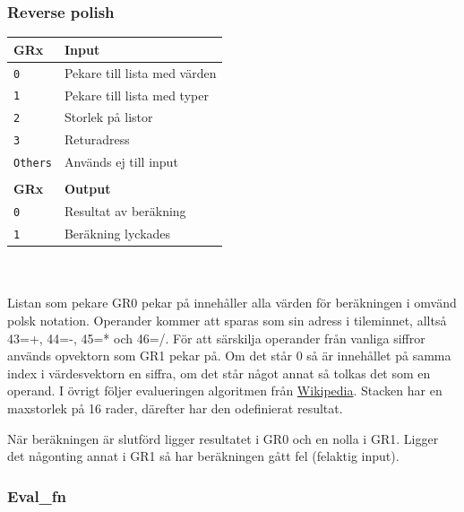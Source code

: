 \documentclass[]{article}
\begin{document}
\subsubsection{Reverse polish}
\begin{tabular}{ll}
	\textbf{GRx}    & \textbf{Input}               \\ \hline
	\texttt{0}      & Pekare till lista med värden \\
	\texttt{1}      & Pekare till lista med typer  \\
	\texttt{2}      & Storlek på listor            \\
	\texttt{3}      & Returadress                  \\
	\texttt{Others} & Används ej till input        \\
	                &  \\
	\textbf{GRx}    & \textbf{Output}              \\ \hline
	\texttt{0}      & Resultat av beräkning        \\
	\texttt{1}      & Beräkning lyckades
\end{tabular}
\\\\
\noindent
Listan som pekare GR0 pekar på innehåller alla värden för beräkningen i omvänd polsk notation. Operander kommer att sparas som sin adress i tileminnet, alltså 43=+, 44=-, 45=* och 46=/. För att särskilja operander från vanliga siffror används opvektorn som GR1 pekar på. Om det står 0 så är innehållet på samma index i värdesvektorn en siffra, om det står något annat så tolkas det som en operand. I övrigt följer evalueringen algoritmen från \href{https://en.wikipedia.org/wiki/Reverse_Polish_notation#Postfix_algorithm}{Wikipedia}. Stacken har en maxstorlek på 16 rader, därefter har den odefinierat resultat. 

När beräkningen är slutförd ligger resultatet i GR0 och en nolla i GR1. Ligger det någonting annat i GR1 så har beräkningen gått fel (felaktig input).

\subsubsection{Eval\_fn}
\end{document}
